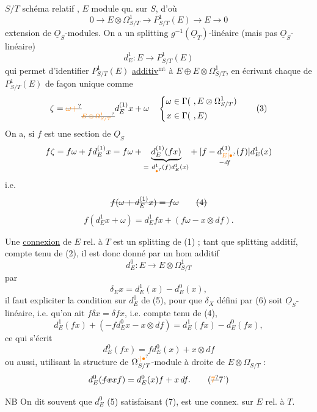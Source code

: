 $S/T$ schéma relatif , $E$ module qu.  sur $S$, d'où
\[
0\longrightarrow E\otimes\Omega^1_{S/T}\longrightarrow P^1_{S/T}(E)
\longrightarrow E\longrightarrow0 \tag*{(1)}
\]
extension de $\underline O_S$-modules. On a un splitting $g^{-1}(\underline O_T)$-linéaire
(mais pas $\underline O_S$-linéaire)
\[
d_E^1:E\longrightarrow P^1_{S/T}(E) \tag*{(2)}
\]
qui permet d'identifier $P^1_{S/T}(E)$ \uline{additiv$^{\mathrm{mt}}$} à $E\oplus E\otimes\Omega^1_{S/T}$, en
écrivant chaque  de $P^1_{S/T}(E)$
 de façon unique comme
\[
\zeta=\deleted{\unsure{\omega+}}\underset{\deleted{\unsure{E\otimes\Omega^1_{S/T}}}}{\,}
 d_E^{(1)}x+\omega\quad
 \left\{\begin{aligned}\omega&\in\Gamma(\ ,E\otimes\Omega^1_{S/T})\\
 x&\in\Gamma(\ ,E)\end{aligned}\right. \tag*{(3)}
\]
On a, si  $f$ est une section de $\underline O_S$
\[
f\zeta=f\omega+fd_E^{(1)}x=f\omega+
\underset{=\ d^1_{\unsure{\bullet}}(f)d^1_E(x)}{\underbrace{d_E^{(1)}(fx)}}+
\underset{-df}{[f-d_{\unsure{E|\bullet}}^{(1)}(f)]}d_E^1(x)
\]
i.e.
\[
\deleted{f(\omega+d_E^{(1)}x)=f\omega}\tag*{\deleted{(4)}}
\]
\[
f(d_E^1x+\omega)=d_E^1fx+(f\omega-x\otimes df).\tag*{(4)}
\]

Une \uline{connexion}  de $E$ rel. à $T$ est un splitting  de (1) ;
 tant que splitting additif, compte tenu de
(2), il est donc donné par un hom additif
\[
d_E^0:E\longrightarrow E\otimes\Omega^1_{S/T} \tag*{(5)}
\]
par
\[
\delta_E x=d_E^1(x)-d_E^0(x), \tag*{(6)}
\]
il faut expliciter la condition sur $d_E^0$ de (5),
pour que $\delta_X$ défini par (6) soit $\underline O_S$-linéaire,
i.e. qu'on ait $f\delta x=\delta fx$, i.e. compte tenu de (4),
\[
d_E^1(fx)+(-fd_E^0x-x\otimes df)=d_E^1(fx)-d_E^0(fx),
\]
ce qui s'écrit
\[
d_E^0(fx)=fd_E^0(x)+x\otimes df \tag*{(7)}
\]
ou aussi, utilisant la structure de $\Omega^{\unsure{\cdot|\bullet}}_{S/T}$-module
à droite de $E\otimes\Omega^{\cdot}_{S/T}$ :
\[
d_E^0(\deleted{fx}xf)=d_E^0(x)f+x\,df.\tag*{(\deleted{\unsure{7}}7')}
\]

NB On dit souvent que $d_E^0$ (5) satisfaisant (7), est une connex. sur $E$ rel. à $T$.

